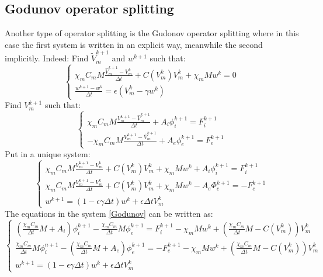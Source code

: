 \documentclass[a4paper,12pt]{article}
\begin{document}
\subsection{Godunov operator splitting}
Another type of operator splitting is the Gudonov operator splitting where in this case the first system is written in an explicit way, meanwhile the second implicitly. Indeed:\newline
Find $\tilde{V}_m^{k+1}$ and $w^{k+1}$ such that:
\begin{equation*}
\begin{cases}
\chi_m C_m M\frac{\hat{V}_m^{k+1} - V_m^k}{\Delta t} + C(V_m^k)V_m^k +\chi_mMw^k = 0\\
\frac{w^{k+1}-w^k}{\Delta t} = \epsilon (V_m^k - \gamma w^k)
\end{cases}
\end{equation*}
Find $V_m^{k+1}$ such that:
\begin{equation*}
\begin{cases}
\chi_m C_m M\frac{V_m^{k+1} - \hat{V}_m^{k+1}}{\Delta t} + A_i\phi_i^{k+1} = F_i^{k+1} \\
-\chi_m C_m M\frac{V_m^{k+1} - \hat{V}_m^{k+1}}{\Delta t} + A_e\phi_e^{k+1} = F_e^{k+1}
\end{cases}
\end{equation*}
Put in a unique system:
\begin{equation}\label{Godunov}
\begin{cases}
\chi_m C_m M\frac{V_m^{k+1} - V_m^k}{\Delta t} + C(V_m^k)V_m^k +\chi_mMw^k + A_i \phi_i^{k+1}= F_i^{k+1} \\
\chi_m C_m M\frac{V_m^{k+1} - V_m^k}{\Delta t} + C(V_m^k)V_m^k +\chi_mMw^k - A_e \Phi_e^{k+1}= -F_e^{k+1} \\
w^{k+1} = (1-\epsilon \gamma \Delta t) w^k + \epsilon \Delta t V_m^k
\end{cases}
\end{equation}
The equations in the system \ref{Godunov} can be written as:
\begin{equation*}
\begin{cases}
\left( \frac{\chi_m C_m}{\Delta t} M + A_i \right ) \phi_i^{k+1} - \frac{\chi_m C_m}{\Delta t} M \phi_e^{k+1} = F_i^{k+1} - \chi_m M w^k + \left( \frac{\chi_m C_m}{\Delta t} M- C(V_m^k)\right) V_m^k\\
\frac{\chi_m C_m}{\Delta t} M  \phi_i^{n+1} - \left(\frac{\chi_m C_m}{\Delta t} M + A_e \right) \phi_e^{k+1} =  -F_e^{k+1} - \chi_m M w^k + \left( \frac{\chi_m C_m}{\Delta t} M- C(V_m^k)\right) V_m^k \\
w^{k+1} = (1-\epsilon \gamma \Delta t) w^k + \epsilon \Delta tV_m^k
\end{cases}
\end{equation*}
\end{document}
